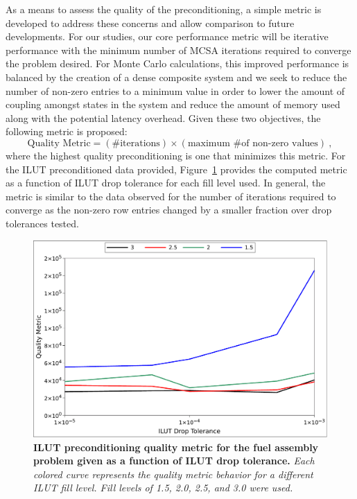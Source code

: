 As a means to assess the quality of the preconditioning, a simple
metric is developed to address these concerns and allow comparison to
future developments. For our studies, our core performance metric will
be iterative performance with the minimum number of MCSA iterations
required to converge the problem desired. For Monte Carlo
calculations, this improved performance is balanced by the creation of
a dense composite system and we seek to reduce the number of non-zero
entries to a minimum value in order to lower the amount of coupling
amongst states in the system and reduce the amount of memory used
along with the potential latency overhead. Given these two objectives,
the following metric is proposed:
\begin{equation}
  \text{Quality Metric} = (\text{\# iterations}) \times (\text{maximum
    \# of non-zero values})\:,
\end{equation}
where the highest quality preconditioning is one that minimizes this
metric. For the ILUT preconditioned data provided,
Figure~\ref{fig:ilut_quality} provides the computed metric as a
function of ILUT drop tolerance for each fill level used. In general,
the metric is similar to the data observed for the number of
iterations required to converge as the non-zero row entries changed by
a smaller fraction over drop tolerances tested.
\begin{figure}[t!]
  \begin{center}
    \includegraphics[width=6in]{chapters/spn_equations/ilut_quality.pdf}
  \end{center}
  \caption{\textbf{ILUT preconditioning quality metric for the fuel
      assembly problem given as a function of ILUT drop tolerance.}
    \textit{Each colored curve represents the quality metric behavior
      for a different ILUT fill level. Fill levels of 1.5, 2.0, 2.5,
      and 3.0 were used.}}
  \label{fig:ilut_quality}
\end{figure}

